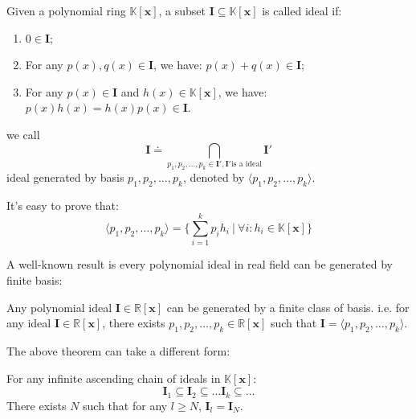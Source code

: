 \documentclass{jssc}
\begin{document}
\begin{definition}
Given a polynomial ring $\mathbb{K}[\boldsymbol{x}]$, a subset $\boldsymbol{I} \subseteq \mathbb{K}[\boldsymbol{x}]$ is called ideal if:
	\begin{enumerate}
		\item $0 \in \boldsymbol{I}$;
		\item For any $p(x), q(x) \in \boldsymbol{I}$, we have: $p(x)+q(x) \in \boldsymbol{I}$;
		\item For any $p(x) \in \boldsymbol{I}$ and $h(x) \in \mathbb{K}[\boldsymbol{x}]$, we have: $p(x)h(x) = h(x)p(x) \in \boldsymbol{I}$.
	\end{enumerate}
\end{definition}

\begin{definition}
we call
	\begin{displaymath}
		\boldsymbol{I} \doteq \bigcap_{p_1,p_2,\dots,p_k \in \boldsymbol{I}', \boldsymbol{I}'\text{is a ideal} }\boldsymbol{I}'
	\end{displaymath}
ideal generated by basis $p_1,p_2,\dots, p_k$, denoted by $\langle p_1, p_2, \dots, p_k \rangle$.

It's easy to prove that:
	\begin{displaymath}
		\langle p_1, p_2, \dots, p_k \rangle = \{\sum_{i=1}^k p_ih_i\ |\ \forall i : h_i \in \mathbb{K}[\boldsymbol{x}]\}
	\end{displaymath}
\end{definition}

A well-known result is every polynomial ideal in real field can be generated by finite basis: 

\begin{theorem}
Any polynomial ideal $\boldsymbol{I} \in \mathbb{R}[\boldsymbol{x}]$ can be generated by a finite class of basis. i.e. for any ideal $\boldsymbol{I} \in \mathbb{R}[\boldsymbol{x}]$, there exists $p_1, p_2, \dots, p_k \in \mathbb{R}[\boldsymbol{x}]$ such that $\boldsymbol{I} = \langle p_1, p_2, \dots, p_k \rangle$.
\end{theorem}

The above theorem can take a different form: 
\begin{theorem}
\label{thm:ascendingChain}
For any infinite ascending chain of ideals in $\mathbb{K}[\boldsymbol{x}]$:
	\begin{equation*}
		\boldsymbol{I}_1 \subseteq \boldsymbol{I}_2 \subseteq \dots \boldsymbol{I}_k \subseteq \dots
	\end{equation*}
There exists $N$ such that for any $l \geq N$, $\boldsymbol{I}_l = \boldsymbol{I}_N$.
\end{theorem}
\end{document}
